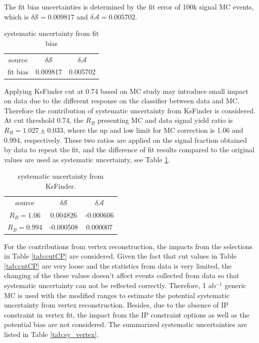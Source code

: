The fit bias uncertainties is determined by the fit error of 100k signal MC events, which is $\delta {\mathcal{S}}=0.009817$ and $\delta {\mathcal{A}}=0.005702$.
\begin{table}[H]
	\begin{minipage}[b]{1.0\linewidth}
		\centering
		\caption{systematic uncertainty from fit bias}
		\begin{tabular}{c c c}
			\hline
			source & $\delta \mathcal{S}$ & $\delta \mathcal{A}$ \\
			fit bias & 0.009817 & 0.005702\\
			\hline
		\end{tabular}
	\end{minipage}
\end{table}

Applying KsFinder cut at 0.74 based on MC study may introduce small impact on data due to the different response on the classifier between data and MC. Therefore the contribution of systematic uncertainty from KsFinder is considered. At cut threshold  0.74, the $R_{B}$ presenting MC and data signal yield ratio is $R_B = 1.027 \pm 0.033$, where the up and low limit for MC correction is 1.06 and 0.994, respectively. These two ratios are applied on the signal fraction obtained by data to repeat the fit, and the difference of fit results compared to the original values are used as systematic uncertainty, see Table \ref{tab:sy_ks}.

\begin{table}[H]
	\begin{minipage}[b]{1.0\linewidth}
		\centering
		\caption{systematic uncertainty from KsFinder.}
		\label{tab:sy_ks}
		\begin{tabular}{c c c}
			\hline
			source & $\delta \mathcal{S}$ & $\delta \mathcal{A}$ \\
			$R_B=1.06$ & 0.004826
 & -0.000606\\
			$R_B=0.994$ & -0.000508
& 0.000007
\\
			\hline
		\end{tabular}
	\end{minipage}
\end{table}

For the contributions from vertex reconstruction, the impacts from the selections in Table \ref{tab:cutCP} are considered. Given the fact that cut values in Table \ref{tab:cutCP} are very loose and the statistics from data is very limited, the changing of the these values doesn't affect events collected from data so that systematic uncertainty can not be reflected correctly. Therefore, 1 ab$^{-1}$ generic MC is used with the modified ranges to estimate the potential systematic uncertainty from vertex reconstruction. Besides, due to the absence of IP constraint in vertex fit, the impact from the IP constraint options as well as the potential bias are not considered. The summarized systematic uncertainties are listed in Table \ref{tab:sy_vertex}.

